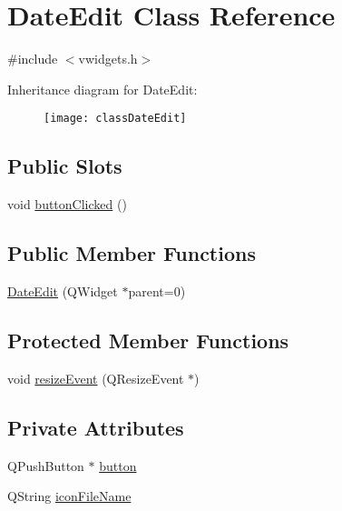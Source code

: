 \hypertarget{classDateEdit}{
\section{DateEdit Class Reference}
\label{classDateEdit}
}


{\ttfamily \#include $<$vwidgets.h$>$}

Inheritance diagram for DateEdit:\begin{figure}[H]
\begin{center}
\leavevmode
\texttt{[image: classDateEdit]}
\end{center}
\end{figure}
\subsection*{Public Slots}
\begin{DoxyCompactItemize}
\item 
void \hyperlink{classDateEdit_a4f16955de169de197867b3298592ce3e}{buttonClicked} ()
\end{DoxyCompactItemize}
\subsection*{Public Member Functions}
\begin{DoxyCompactItemize}
\item 
\hyperlink{classDateEdit_a2419b5b3044083ab297107966ba4b310}{DateEdit} (QWidget $\ast$parent=0)
\end{DoxyCompactItemize}
\subsection*{Protected Member Functions}
\begin{DoxyCompactItemize}
\item 
void \hyperlink{classDateEdit_a84296994dc057b587ea9542604a3e050}{resizeEvent} (QResizeEvent $\ast$)
\end{DoxyCompactItemize}
\subsection*{Private Attributes}
\begin{DoxyCompactItemize}
\item 
QPushButton $\ast$ \hyperlink{classDateEdit_a54dc3b413c28dac9aa044d185b17bccf}{button}
\item 
QString \hyperlink{classDateEdit_a79214d87b36dc55ec6f783fa287d238d}{iconFileName}
\end{DoxyCompactItemize}


